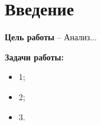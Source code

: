 \chapter*{Введение}
\textbf{Цель работы} – Анализ...

\textbf{Задачи работы:}
\begin{itemize}
	\item 1;
	\item 2;
	\item 3.
\end{itemize}